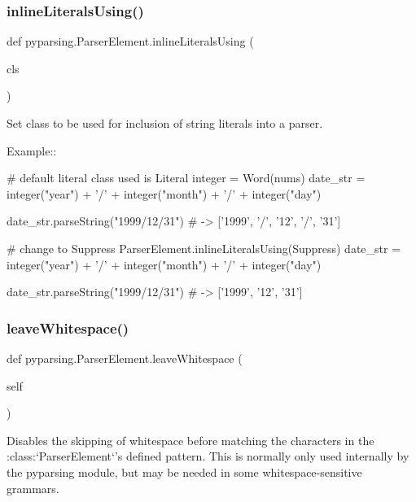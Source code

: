 \subsubsection{\texorpdfstring{inline\+Literals\+Using()}{inlineLiteralsUsing()}}
{\footnotesize\ttfamily def pyparsing.\+Parser\+Element.\+inline\+Literals\+Using (\begin{DoxyParamCaption}\item[{}]{cls }\end{DoxyParamCaption})\hspace{0.3cm}{\ttfamily [static]}}

\begin{DoxyVerb}Set class to be used for inclusion of string literals into a parser.

Example::

    # default literal class used is Literal
    integer = Word(nums)
    date_str = integer("year") + '/' + integer("month") + '/' + integer("day")

    date_str.parseString("1999/12/31")  # -> ['1999', '/', '12', '/', '31']


    # change to Suppress
    ParserElement.inlineLiteralsUsing(Suppress)
    date_str = integer("year") + '/' + integer("month") + '/' + integer("day")

    date_str.parseString("1999/12/31")  # -> ['1999', '12', '31']
\end{DoxyVerb}
 \mbox{\label{classpyparsing_1_1ParserElement_ac3de85a4c5fed7bc8d10967c7c985f8a}} 
\subsubsection{\texorpdfstring{leave\+Whitespace()}{leaveWhitespace()}}
{\footnotesize\ttfamily def pyparsing.\+Parser\+Element.\+leave\+Whitespace (\begin{DoxyParamCaption}\item[{}]{self }\end{DoxyParamCaption})}

\begin{DoxyVerb}Disables the skipping of whitespace before matching the characters in the
:class:`ParserElement`'s defined pattern.  This is normally only used internally by
the pyparsing module, but may be needed in some whitespace-sensitive grammars.
\end{DoxyVerb}
 \mbox{\label{classpyparsing_1_1ParserElement_a74c460f23d82ac8aff6b6afb6003bf3e}} 
